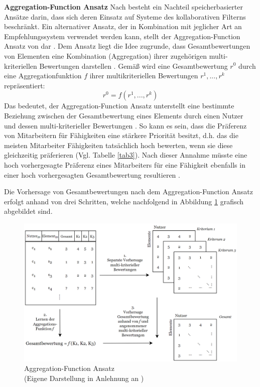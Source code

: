 \textbf{Aggregation-Function Ansatz}
Nach \textcite[S. 861]{adomavicius:4:inbook} besteht ein Nachteil speicherbasierter Ansätze darin, dass sich deren Einsatz auf Systeme des kollaborativen Filterns beschränkt.
Ein alternativer Ansatz, der in Kombination mit jeglicher Art an Empfehlungssystem verwendet werden kann, stellt der Aggregation-Function Ansatz von \textcite[S. 52ff.]{adomavicius:inproceedings:2} dar \cite[S. 861]{adomavicius:4:inbook}.
Dem Ansatz liegt die Idee zugrunde, dass Gesamtbewertungen von Elementen eine Kombination (Aggregation) ihrer zugehörigen multi-kriteriellen Bewertungen darstellen \cite[S. 861]{adomavicius:4:inbook}.
Gemäß \textcite[S. 52]{adomavicius:inproceedings:2} wird eine Gesamtbewertung $r^{0}$ durch eine Aggregationfunktion $f$ ihrer multikriteriellen Bewertungen $r^{1}, ..., r^{k}$ repräsentiert:
\begin{equation}\label{eq22}
    r^{0} = f(r^{1}, ..., r^{k})
\end{equation}
Das bedeutet, der Aggregation-Function Ansatz unterstellt eine bestimmte Beziehung zwischen der Gesamtbewertung eines Elements durch einen Nutzer und dessen multi-kriterieller Bewertungen \cite[S. 52]{adomavicius:inproceedings:2}.
So kann es sein, dass die Präferenz von Mitarbeitern für Fähigkeiten eine stärkere Priorität besitzt, d.h. das die meisten Mitarbeiter Fähigkeiten tatsächlich hoch bewerten, wenn sie diese gleichzeitig präferieren (Vgl. Tabelle \ref{tab3}).
Nach dieser Annahme müsste eine hoch vorhergesagte Präferenz eines Mitarbeiters für eine Fähigkeit ebenfalls in einer hoch vorhergesagten Gesamtbewertung resultieren \cite[S. 52]{adomavicius:inproceedings:2}.

Die Vorhersage von Gesamtbewertungen nach dem Aggregation-Function Ansatz erfolgt anhand von drei Schritten, welche nachfolgend in Abbildung \ref{fig:optimierung:loesungen:abb1} grafisch abgebildet sind.

\begin{figure}
    \centering
	\includegraphics[width=1.0\textwidth]{gfx/a-f-ansatz.png}
	\caption[Aggregation-Function Ansatz]{Aggregation-Function Ansatz\\
    (Eigene Darstellung in Anlehnung an \cite[S. 862]{adomavicius:4:inbook})}
	\label{fig:optimierung:loesungen:abb1}
\end{figure}

